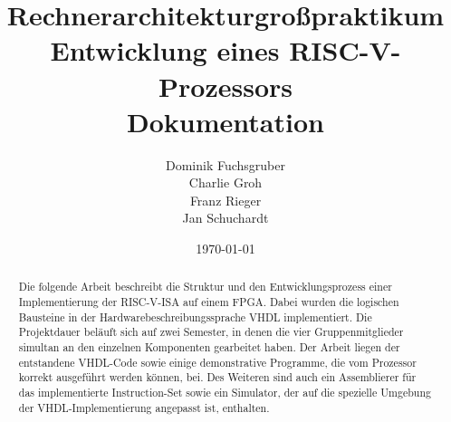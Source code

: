 \documentclass{report}
\title{\large \textbf{Rechnerarchitekturgro\ss{}praktikum} \\[10pt] Entwicklung eines RISC-V-Prozessors \\[10pt] \Huge Dokumentation}
\author{Dominik Fuchsgruber \\ Charlie Groh \\ Franz Rieger \\ Jan Schuchardt}
\date{\today}
\begin{document}
\maketitle
\begin{abstract}
Die folgende Arbeit beschreibt die Struktur und den Entwicklungsprozess einer
Implementierung der RISC-V-ISA auf einem FPGA. Dabei wurden die logischen
Bausteine in der Hardwarebeschreibungssprache VHDL implementiert. Die
Projektdauer bel\"auft sich auf zwei Semester, in denen die vier
Gruppenmitglieder simultan an den einzelnen Komponenten gearbeitet haben. Der
Arbeit liegen der entstandene VHDL-Code sowie einige
demonstrative Programme, die vom Prozessor korrekt ausgef\"uhrt werden
k\"onnen, bei. Des Weiteren sind auch ein Assemblierer f\"ur das implementierte
Instruction-Set sowie ein Simulator, der auf die spezielle Umgebung der
VHDL-Implementierung angepasst ist, enthalten.
\end{abstract}
\begingroup
\let\clearpage\relax
\let\textbf\relax
\tableofcontents
\listoftables
\listoffigures
\endgroup
\clearpage{}








\appendix{}

\clearpage{}

\clearpage{}

\clearpage{}
\end{document}
